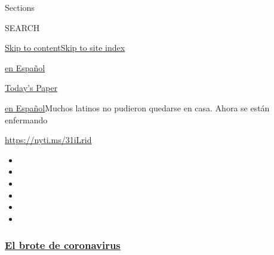 Sections

SEARCH

\protect\hyperlink{site-content}{Skip to
content}\protect\hyperlink{site-index}{Skip to site index}

\href{https://www.nytimes3xbfgragh.onion/es/}{en Español}

\href{https://myaccount.nytimes3xbfgragh.onion/auth/login?response_type=cookie\&client_id=vi}{}

\href{https://www.nytimes3xbfgragh.onion/section/todayspaper}{Today's
Paper}

\href{/es/}{en Español}\textbar{}Muchos latinos no pudieron quedarse en
casa. Ahora se están enfermando

\url{https://nyti.ms/31iLrid}

\begin{itemize}
\item
\item
\item
\item
\item
\item
\end{itemize}

\hypertarget{el-brote-de-coronavirus}{%
\subsubsection{\texorpdfstring{\href{https://www.nytimes3xbfgragh.onion/es/spotlight/coronavirus?name=styln-coronavirus-es\&region=TOP_BANNER\&block=storyline_menu_recirc\&action=click\&pgtype=Article\&impression_id=e2b81a60-f2b5-11ea-9507-e581488c52dd\&variant=undefined}{El
brote de
coronavirus}}{El brote de coronavirus}}\label{el-brote-de-coronavirus}}

